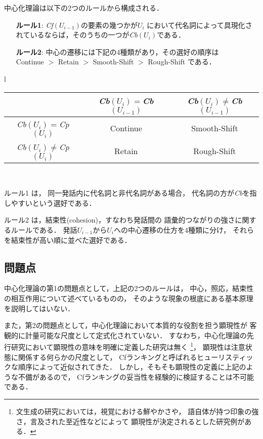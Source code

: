 中心化理論は以下の2つのルールから構成される\cite{walker1994}．


\begin{breakbox}
\begin{itemize}
\item[{\bf ルール1}:　] {\it Cf}$(U_{i-1})$の要素の幾つかが$U_i$ において代名詞によって具現化されているならば，そのうちの一つが{\it Cb}$(U_i)$である．
\item[{\bf ルール2}:　] 中心の遷移には下記の4種類があり，その選好の順序は\\
Continue $>$ Retain $>$ Smooth-Shift $>$ Rough-Shift である．
\end{itemize}
\begin{center}
{\small
\begin{tabular}{l}
\begin{tabular}{|c||c|c|}
\hline
&{\it Cb}$(U_i) = ${\it Cb}$(U_{i-1})$&{\it Cb}$(U_i) \neq ${\it Cb}$(U_{i-1})$\\
\hline\hline
{\it Cb}$(U_i) = ${\it Cp}$(U_i)$&Continue&Smooth-Shift\\
\hline
{\it Cb}$(U_i) \neq ${\it Cp}$(U_i)$&Retain&Rough-Shift\\
\hline
\end{tabular}\\
\end{tabular}
}
\end{center}
\end{breakbox}

ルール1 は，
同一発話内に代名詞と非代名詞がある場合，
代名詞の方が{\it Cb}を指しやすいという選好である．

ルール2 は，結束性(cohesion)，すなわち発話間の
語彙的つながりの強さに関するルールである．
発話$U_{i-1}$から$U_i$への中心遷移の仕方を4種類に分け，
それらを結束性が高い順に並べた選好である．

\subsection{問題点}
中心化理論の第1の問題点として，上記の2つのルールは，
中心，照応，結束性の相互作用について述べているものの，
そのような現象の根底にある基本原理を説明してはいない．

また，第2の問題点として，中心化理論において本質的な役割を担う顕現性が
客観的に計量可能な尺度として定式化されていない．
すなわち，中心化理論の先行研究において顕現性の意味を明確に定義した研究は無く
\footnote{文生成の研究においては，視覚における鮮やかさや，
語自体が持つ印象の強さ，言及された至近性などによって
顕現性が決定されるとした研究例がある\cite{reed2002}．}，
顕現性は注意状態に関係する何らかの尺度として，
Cfランキングと呼ばれるヒューリスティックな順序によって近似されてきた．
しかし，そもそも顕現性の定義に上記のような不備があるので，
Cfランキングの妥当性を経験的に検証することは不可能である．

